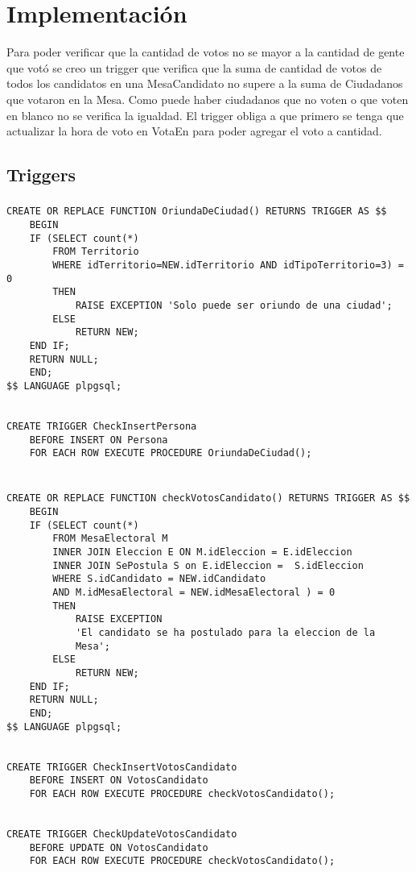 \section{Implementación}


Para poder verificar que la cantidad de votos no se mayor a la cantidad de gente que votó se creo un trigger que verifica que la suma de  cantidad de votos de todos los  candidatos en una MesaCandidato no supere a la suma de Ciudadanos que votaron en la Mesa. Como puede haber ciudadanos que no voten o que voten en blanco no se verifica la igualdad. 
    El trigger obliga  a que primero se tenga que actualizar la hora de voto en VotaEn para poder agregar el voto a cantidad. 

\subsection{Triggers}

\subsubsection{}

\begin{verbatim}
CREATE OR REPLACE FUNCTION OriundaDeCiudad() RETURNS TRIGGER AS $$
    BEGIN
    IF (SELECT count(*) 
        FROM Territorio 
        WHERE idTerritorio=NEW.idTerritorio AND idTipoTerritorio=3) = 0 
        THEN
            RAISE EXCEPTION 'Solo puede ser oriundo de una ciudad';              
        ELSE
            RETURN NEW;
    END IF;
    RETURN NULL;
    END;
$$ LANGUAGE plpgsql;


CREATE TRIGGER CheckInsertPersona
    BEFORE INSERT ON Persona
    FOR EACH ROW EXECUTE PROCEDURE OriundaDeCiudad();

\end{verbatim}

\subsubsection{}
\begin{verbatim}

CREATE OR REPLACE FUNCTION checkVotosCandidato() RETURNS TRIGGER AS $$
    BEGIN
    IF (SELECT count(*) 
        FROM MesaElectoral M 
        INNER JOIN Eleccion E ON M.idEleccion = E.idEleccion
        INNER JOIN SePostula S on E.idEleccion =  S.idEleccion
        WHERE S.idCandidato = NEW.idCandidato 
        AND M.idMesaElectoral = NEW.idMesaElectoral ) = 0
        THEN
            RAISE EXCEPTION 
            'El candidato se ha postulado para la eleccion de la 
            Mesa';              
        ELSE
            RETURN NEW;
    END IF;
    RETURN NULL;
    END;
$$ LANGUAGE plpgsql;


CREATE TRIGGER CheckInsertVotosCandidato
    BEFORE INSERT ON VotosCandidato
    FOR EACH ROW EXECUTE PROCEDURE checkVotosCandidato();


CREATE TRIGGER CheckUpdateVotosCandidato
    BEFORE UPDATE ON VotosCandidato
    FOR EACH ROW EXECUTE PROCEDURE checkVotosCandidato();


\end{verbatim}
